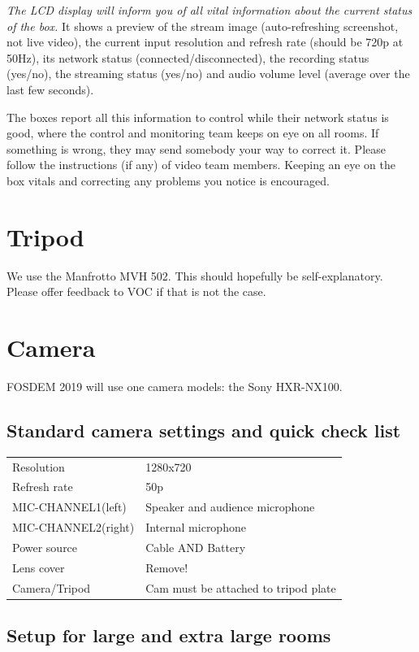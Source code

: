 \documentclass{article}
\begin{document}
\emph{The LCD display will inform you of all vital information about the current status of the box.} It shows a preview of the stream image (auto-refreshing screenshot, not live video), the current input resolution and refresh rate (should be 720p at 50Hz), its network status (connected/disconnected), the recording status (yes/no), the streaming status (yes/no) and audio volume level (average over the last few seconds).

The boxes report all this information to control while their network status is good, where the control and monitoring team keeps on eye on all rooms. If something is wrong, they may send somebody your way to correct it. Please follow the instructions (if any) of video team members. Keeping an eye on the box vitals and correcting any problems you notice is encouraged.

\section{Tripod}
We use the Manfrotto MVH 502. This should hopefully be self-explanatory. Please offer feedback to VOC if that is not the case.

\section{Camera}
FOSDEM 2019 will use one camera models: the Sony HXR-NX100.

\subsection{Standard camera settings and quick check list}
\begin{tabular}{| l | l |}
Resolution & 1280x720 \\
Refresh rate & 50p \\
MIC-CHANNEL1(left) &  Speaker and audience microphone \\
MIC-CHANNEL2(right) & Internal microphone \\
Power source & Cable AND Battery \\
Lens cover & Remove! \\
Camera/Tripod & Cam must be attached to tripod plate \\
\end{tabular}

\subsection{Setup for large and extra large rooms}
\end{document}
